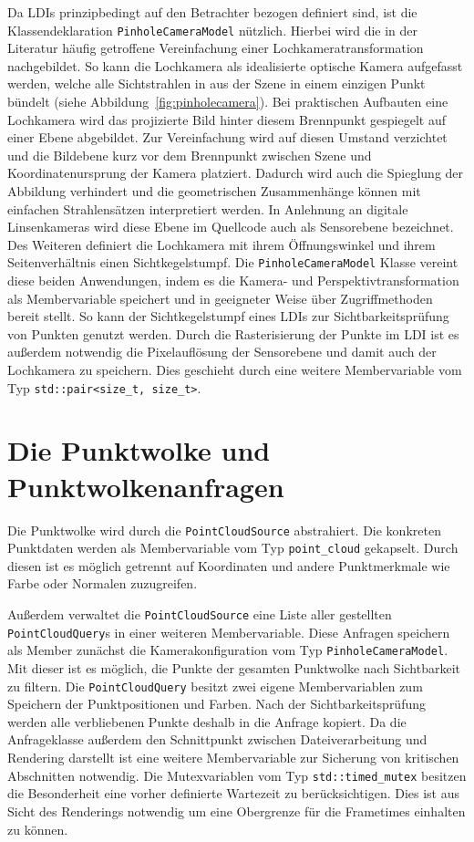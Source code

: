 \documentclass[hyperref, beleg, german]{cgvpub}
\begin{document}
Da LDIs prinzipbedingt auf den Betrachter bezogen definiert sind, ist die
Klassendeklaration \texttt{PinholeCameraModel} nützlich. Hierbei wird die in
der Literatur häufig getroffene Vereinfachung einer Lochkameratransformation
nachgebildet. So kann die Lochkamera als idealisierte optische Kamera
aufgefasst werden, welche alle Sichtstrahlen in aus der Szene in einem einzigen
Punkt bündelt (siehe Abbildung~\ref{fig:pinholecamera}). Bei praktischen
Aufbauten eine Lochkamera wird das projizierte Bild hinter diesem Brennpunkt
gespiegelt auf einer Ebene abgebildet. Zur Vereinfachung wird auf diesen
Umstand verzichtet und die Bildebene kurz vor dem Brennpunkt zwischen Szene und
Koordinatenursprung der Kamera platziert. Dadurch wird auch die Spieglung der
Abbildung verhindert und die geometrischen Zusammenhänge können mit einfachen
Strahlensätzen interpretiert werden. In Anlehnung an digitale Linsenkameras
wird diese Ebene im Quellcode auch als Sensorebene bezeichnet. Des Weiteren
definiert die Lochkamera mit ihrem Öffnungswinkel und ihrem Seitenverhältnis
einen Sichtkegelstumpf. Die \texttt{PinholeCameraModel} Klasse vereint diese
beiden Anwendungen, indem es die Kamera- und Perspektivtransformation als
Membervariable speichert und in geeigneter Weise über Zugriffmethoden bereit
stellt. So kann der Sichtkegelstumpf eines LDIs zur Sichtbarkeitsprüfung von
Punkten genutzt werden. Durch die Rasterisierung der Punkte im LDI ist es
außerdem notwendig die Pixelauflösung der Sensorebene und damit auch der
Lochkamera zu speichern. Dies geschieht durch eine weitere Membervariable vom
Typ \texttt{std::pair<size\_t, size\_t>}.

\section{Die Punktwolke und Punktwolkenanfragen}

Die Punktwolke wird durch die \texttt{PointCloudSource} abstrahiert. Die
konkreten Punktdaten werden als Membervariable vom Typ \texttt{point\_cloud}
gekapselt. Durch diesen ist es möglich getrennt auf Koordinaten und andere
Punktmerkmale wie Farbe oder Normalen zuzugreifen.

Außerdem verwaltet die \texttt{PointCloudSource} eine Liste aller gestellten
\texttt{PointCloudQuery}s in einer weiteren Membervariable. Diese Anfragen
speichern als Member zunächst die Kamerakonfiguration vom Typ
\texttt{PinholeCameraModel}. Mit dieser ist es möglich, die Punkte der gesamten
Punktwolke nach Sichtbarkeit zu filtern. Die \texttt{PointCloudQuery} besitzt
zwei eigene Membervariablen zum Speichern der Punktpositionen und Farben. Nach
der Sichtbarkeitsprüfung werden alle verbliebenen Punkte deshalb in die Anfrage
kopiert. Da die Anfrageklasse außerdem den Schnittpunkt zwischen
Dateiverarbeitung und Rendering darstellt ist eine weitere Membervariable zur
Sicherung von kritischen Abschnitten notwendig. Die Mutexvariablen vom Typ
\texttt{std::timed\_mutex} besitzen die Besonderheit eine vorher definierte
Wartezeit zu berücksichtigen. Dies ist aus Sicht des Renderings notwendig um
eine Obergrenze für die Frametimes einhalten zu können.
\end{document}
